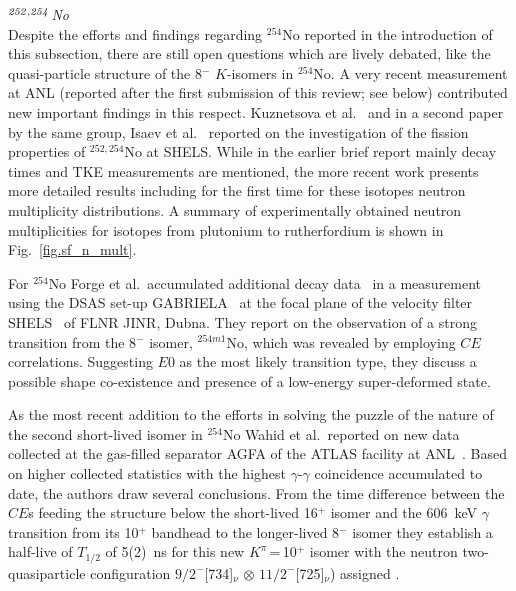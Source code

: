 {\it $^{\it252,254}$No}\\ 
Despite the efforts and findings regarding $^{254}$No reported in the introduction of this subsection, there are still open questions which are lively debated, like the quasi-particle structure of the 8$^-$ $K$-isomers in $^{254}$No.
A very recent measurement at ANL (reported after the first submission of this review; see below) contributed new important findings in this respect.
Kuznetsova et al.~\cite{Kuznetsova2020} and in a second paper by the same group, Isaev et al.~\cite{Isaev2021} reported on the investigation of the fission properties of $^{252,254}$No at SHELS.
While in the earlier brief report mainly decay times and TKE measurements are mentioned, the more recent work presents more detailed results including for the first time for these isotopes neutron multiplicity distributions.
A summary of experimentally obtained neutron multiplicities for isotopes from plutonium to rutherfordium is shown in Fig.~\ref{fig.sf_n_mult}.

For $^{254}$No Forge et al.~accumulated additional decay data~\cite{Forge2023} in a measurement using the DSAS set-up GABRIELA~\cite{Hauschild2006,Chakma2020} at the focal plane of the velocity filter SHELS~\cite{Popeko2016} of FLNR JINR, Dubna.
They report on the observation of a strong transition from the 8$^-$ isomer, $^{254m1}$No, which was revealed by employing $CE$ correlations. 
Suggesting $E0$ as the most likely transition type, they discuss a possible shape co-existence and presence of a low-energy super-deformed state.

As the most recent addition to the efforts in solving the puzzle of the nature of the second short-lived isomer in $^{254}$No Wahid et al.~reported on new data collected at the gas-filled separator AGFA of the ATLAS facility at ANL~\cite{Wahid2025}.
Based on higher collected statistics with the highest $\gamma$-$\gamma$ coincidence accumulated to date, the authors draw several conclusions. 
From the time difference between the $CE$s feeding the structure below the short-lived 16$^+$ isomer and the 606~keV $\gamma$ transition from its 10$^+$ bandhead to the longer-lived 8$^-$ isomer they establish a half-live of $T_{1/2}$ of 5(2)~ns for this new $K^\pi$\,=\,10$^+$ isomer with the neutron two-quasiparticle configuration $9/2^-$[734]$_\nu$ $\otimes$ $11/2^-$[725]$_\nu$) assigned \cite{Wahid2025,Clark2010}.


